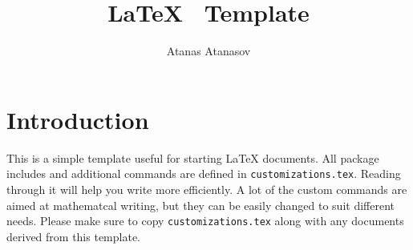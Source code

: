 \documentclass{article}
\begin{document}
\title{\LaTeX~ Template}
\author{Atanas Atanasov}
\date{}

\maketitle

\section{Introduction}
\label{S:introduction}

This is a simple template useful for starting LaTeX documents. All package includes and additional commands are defined in \texttt{customizations.tex}. Reading through it will help you write more efficiently. A lot of the custom commands are aimed at mathematcal writing, but they can be easily changed to suit different needs. Please make sure to copy \texttt{customizations.tex} along with any documents derived from this template.

\nocite{*}



\end{document}
